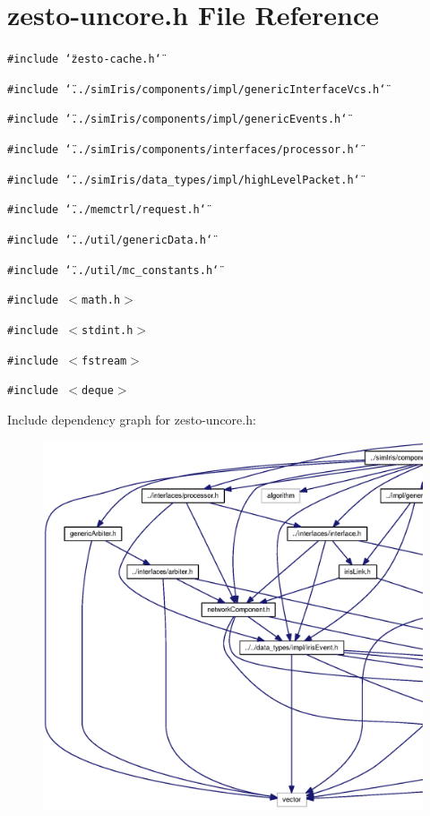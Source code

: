 \section{zesto-uncore.h File Reference}
\label{zesto-uncore_8h}
{\tt \#include \char`\"{}zesto-cache.h\char`\"{}}\par
{\tt \#include \char`\"{}../simIris/components/impl/genericInterfaceVcs.h\char`\"{}}\par
{\tt \#include \char`\"{}../simIris/components/impl/genericEvents.h\char`\"{}}\par
{\tt \#include \char`\"{}../simIris/components/interfaces/processor.h\char`\"{}}\par
{\tt \#include \char`\"{}../simIris/data\_\-types/impl/highLevelPacket.h\char`\"{}}\par
{\tt \#include \char`\"{}../memctrl/request.h\char`\"{}}\par
{\tt \#include \char`\"{}../util/genericData.h\char`\"{}}\par
{\tt \#include \char`\"{}../util/mc\_\-constants.h\char`\"{}}\par
{\tt \#include $<$math.h$>$}\par
{\tt \#include $<$stdint.h$>$}\par
{\tt \#include $<$fstream$>$}\par
{\tt \#include $<$deque$>$}\par


Include dependency graph for zesto-uncore.h:\nopagebreak
\begin{figure}[H]
\begin{center}
\leavevmode
\includegraphics[width=420pt]{zesto-uncore_8h__incl}
\end{center}
\end{figure}


